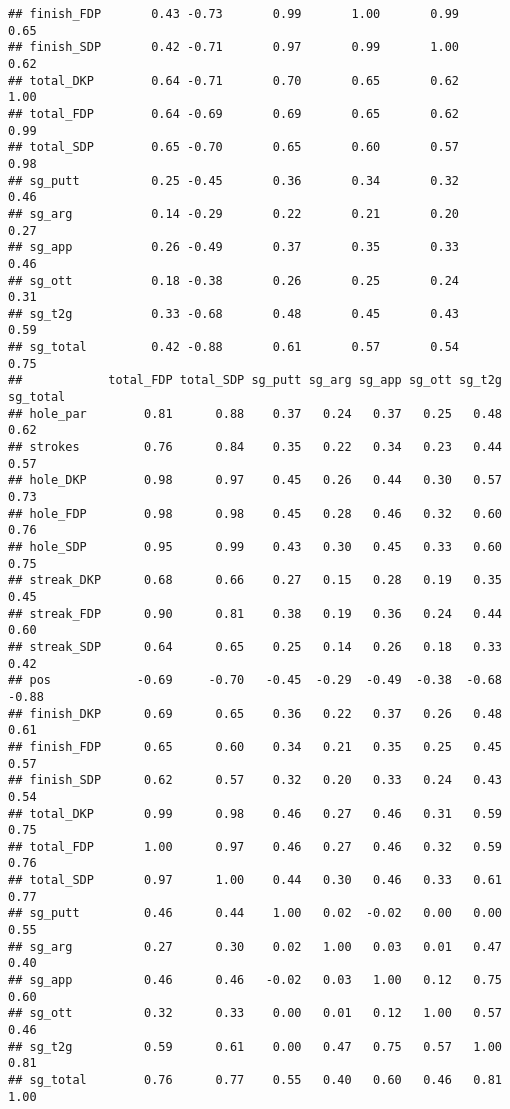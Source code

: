 \documentclass[
]{article}
\begin{document}
\begin{verbatim}
## finish_FDP       0.43 -0.73       0.99       1.00       0.99      0.65
## finish_SDP       0.42 -0.71       0.97       0.99       1.00      0.62
## total_DKP        0.64 -0.71       0.70       0.65       0.62      1.00
## total_FDP        0.64 -0.69       0.69       0.65       0.62      0.99
## total_SDP        0.65 -0.70       0.65       0.60       0.57      0.98
## sg_putt          0.25 -0.45       0.36       0.34       0.32      0.46
## sg_arg           0.14 -0.29       0.22       0.21       0.20      0.27
## sg_app           0.26 -0.49       0.37       0.35       0.33      0.46
## sg_ott           0.18 -0.38       0.26       0.25       0.24      0.31
## sg_t2g           0.33 -0.68       0.48       0.45       0.43      0.59
## sg_total         0.42 -0.88       0.61       0.57       0.54      0.75
##            total_FDP total_SDP sg_putt sg_arg sg_app sg_ott sg_t2g sg_total
## hole_par        0.81      0.88    0.37   0.24   0.37   0.25   0.48     0.62
## strokes         0.76      0.84    0.35   0.22   0.34   0.23   0.44     0.57
## hole_DKP        0.98      0.97    0.45   0.26   0.44   0.30   0.57     0.73
## hole_FDP        0.98      0.98    0.45   0.28   0.46   0.32   0.60     0.76
## hole_SDP        0.95      0.99    0.43   0.30   0.45   0.33   0.60     0.75
## streak_DKP      0.68      0.66    0.27   0.15   0.28   0.19   0.35     0.45
## streak_FDP      0.90      0.81    0.38   0.19   0.36   0.24   0.44     0.60
## streak_SDP      0.64      0.65    0.25   0.14   0.26   0.18   0.33     0.42
## pos            -0.69     -0.70   -0.45  -0.29  -0.49  -0.38  -0.68    -0.88
## finish_DKP      0.69      0.65    0.36   0.22   0.37   0.26   0.48     0.61
## finish_FDP      0.65      0.60    0.34   0.21   0.35   0.25   0.45     0.57
## finish_SDP      0.62      0.57    0.32   0.20   0.33   0.24   0.43     0.54
## total_DKP       0.99      0.98    0.46   0.27   0.46   0.31   0.59     0.75
## total_FDP       1.00      0.97    0.46   0.27   0.46   0.32   0.59     0.76
## total_SDP       0.97      1.00    0.44   0.30   0.46   0.33   0.61     0.77
## sg_putt         0.46      0.44    1.00   0.02  -0.02   0.00   0.00     0.55
## sg_arg          0.27      0.30    0.02   1.00   0.03   0.01   0.47     0.40
## sg_app          0.46      0.46   -0.02   0.03   1.00   0.12   0.75     0.60
## sg_ott          0.32      0.33    0.00   0.01   0.12   1.00   0.57     0.46
## sg_t2g          0.59      0.61    0.00   0.47   0.75   0.57   1.00     0.81
## sg_total        0.76      0.77    0.55   0.40   0.60   0.46   0.81     1.00
\end{verbatim}
\end{document}
